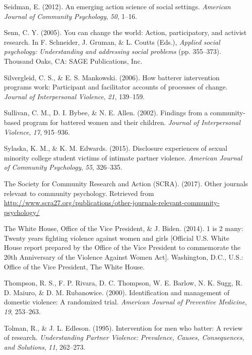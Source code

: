 \documentclass[11pt,]{tufte-book}
\begin{document}
\hypertarget{ref-seidman2012emerging}{}
Seidman, E. (2012). An emerging action science of social settings.
\emph{American Journal of Community Psychology}, \emph{50}, 1--16.

\hypertarget{ref-senn2005you}{}
Senn, C. Y. (2005). You can change the world: Action, participatory, and
activist research. In F. Schneider, J. Gruman, \& L. Coutts (Eds.),
\emph{Applied social psychology: Understanding and addressing social
problems} (pp. 355--373). Thousand Oaks, CA: SAGE Publications, Inc.

\hypertarget{ref-silvergleid2006batterer}{}
Silvergleid, C. S., \& E. S. Mankowski. (2006). How batterer
intervention programs work: Participant and facilitator accounts of
processes of change. \emph{Journal of Interpersonal Violence},
\emph{21}, 139--159.

\hypertarget{ref-sullivan2002findings}{}
Sullivan, C. M., D. I. Bybee, \& N. E. Allen. (2002). Findings from a
community-based program for battered women and their children.
\emph{Journal of Interpersonal Violence}, \emph{17}, 915--936.

\hypertarget{ref-sylaska2015disclosure}{}
Sylaska, K. M., \& K. M. Edwards. (2015). Disclosure experiences of
sexual minority college student victims of intimate partner violence.
\emph{American Journal of Community Psychology}, \emph{55}, 326--335.

\hypertarget{ref-scra2017other}{}
The Society for Community Research and Action (SCRA). (2017). Other
journals relevant to community psychology. Retrieved from
\url{http://www.scra27.org/publications/other-journals-relevant-community-psychology/}

\hypertarget{ref-biden2014twenty}{}
The White House, Office of the Vice President, \& J. Biden. (2014). 1 is
2 many: Twenty years fighting violence against women and girls
{[}Official U.S. White House report prepared by the Office of the Vice
President to commemorate the 20th Anniversary of the Violence Against
Women Act{]}. Washington, D.C., U.S.: Office of the Vice President, The
White House.

\hypertarget{ref-thompson2000identification}{}
Thompson, R. S., F. P. Rivara, D. C. Thompson, W. E. Barlow, N. K. Sugg,
R. D. Maiuro, \& D. M. Rubanowice. (2000). Identification and management
of domestic violence: A randomized trial. \emph{American Journal of
Preventive Medicine}, \emph{19}, 253--263.

\hypertarget{ref-tolman1995intervention}{}
Tolman, R., \& J. L. Edleson. (1995). Intervention for men who batter: A
review of research. \emph{Understanding Partner Violence: Prevalence,
Causes, Consequences, and Solutions}, \emph{11}, 262--273.
\end{document}
